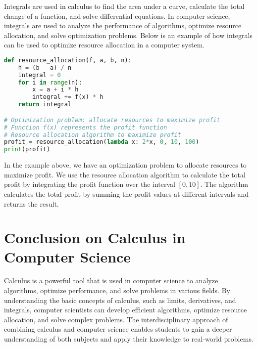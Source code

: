 Integrals are used in calculus to find the area under a curve, calculate the total change of a function, and solve differential equations. In computer science, integrals are used to analyze the performance of algorithms, optimize resource allocation, and solve optimization problems. Below is an example of how integrals can be used to optimize resource allocation in a computer system.

\begin{lstlisting}[language=Python, caption=Example of using integrals to optimize resource allocation]
def resource_allocation(f, a, b, n):
    h = (b - a) / n
    integral = 0
    for i in range(n):
        x = a + i * h
        integral += f(x) * h
    return integral

# Optimization problem: allocate resources to maximize profit
# Function f(x) represents the profit function
# Resource allocation algorithm to maximize profit
profit = resource_allocation(lambda x: 2*x, 0, 10, 100)
print(profit)
\end{lstlisting}

In the example above, we have an optimization problem to allocate resources to maximize profit. We use the resource allocation algorithm to calculate the total profit by integrating the profit function over the interval $[0, 10]$. The algorithm calculates the total profit by summing the profit values at different intervals and returns the result.

\section{Conclusion on Calculus in Computer Science}

Calculus is a powerful tool that is used in computer science to analyze algorithms, optimize performance, and solve problems in various fields. By understanding the basic concepts of calculus, such as limits, derivatives, and integrals, computer scientists can develop efficient algorithms, optimize resource allocation, and solve complex problems. The interdisciplinary approach of combining calculus and computer science enables students to gain a deeper understanding of both subjects and apply their knowledge to real-world problems.